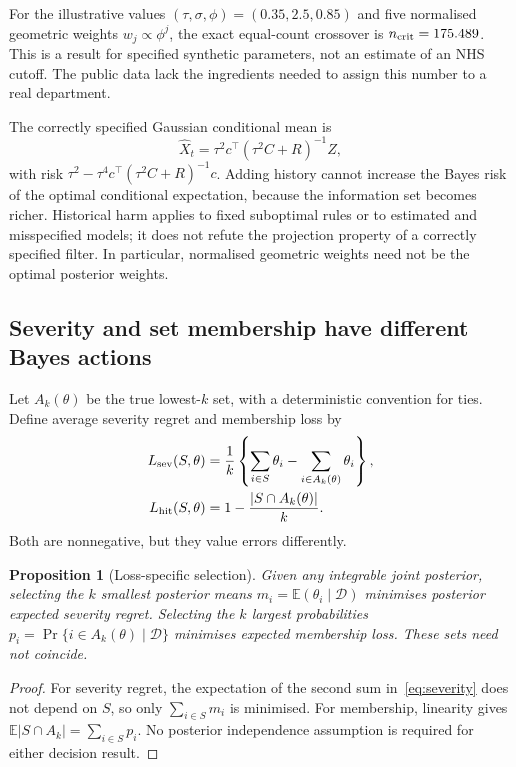 \documentclass[11pt,letterpaper]{article}
\newtheorem{proposition}{Proposition}
\newcommand{\E}{\mathbb E}
\begin{document}
For the illustrative values $(\tau,\sigma,\phi)=(0.35,2.5,0.85)$ and five normalised geometric weights $w_j\propto\phi^j$, the exact equal-count crossover is $n_{\rm crit}=175.489$. This is a result for specified synthetic parameters, not an estimate of an NHS cutoff. The public data lack the ingredients needed to assign this number to a real department.

The correctly specified Gaussian conditional mean is
\begin{equation}
 \widehat X_t=\tau^2c^\top(\tau^2C+R)^{-1}Z,
 \label{eq:gaussian_posterior}
\end{equation}
with risk $\tau^2-\tau^4c^\top(\tau^2C+R)^{-1}c$. Adding history cannot increase the Bayes risk of the optimal conditional expectation, because the information set becomes richer. Historical harm applies to fixed suboptimal rules or to estimated and misspecified models; it does not refute the projection property of a correctly specified filter. In particular, normalised geometric weights need not be the optimal posterior weights.

\subsection{Severity and set membership have different Bayes actions}
Let $A_k(\theta)$ be the true lowest-$k$ set, with a deterministic convention for ties. Define average severity regret and membership loss by
\begin{align}
 L_{\rm sev}(S,\theta)&=\frac1k\left\{\sum_{i\in S}\theta_i-
                                   \sum_{i\in A_k(\theta)}\theta_i\right\},\label{eq:severity}\\
 L_{\rm hit}(S,\theta)&=1-\frac{|S\cap A_k(\theta)|}{k}.\label{eq:hit}
\end{align}
Both are nonnegative, but they value errors differently.
\begin{proposition}[Loss-specific selection]\label{prop:loss}
Given any integrable joint posterior, selecting the $k$ smallest posterior means $m_i=\E(\theta_i\mid\mathcal D)$ minimises posterior expected severity regret. Selecting the $k$ largest probabilities $p_i=\Pr\{i\in A_k(\theta)\mid\mathcal D\}$ minimises expected membership loss. These sets need not coincide.
\end{proposition}
\begin{proof}
For severity regret, the expectation of the second sum in~\eqref{eq:severity} does not depend on $S$, so only $\sum_{i\in S}m_i$ is minimised. For membership, linearity gives $\E|S\cap A_k|=\sum_{i\in S}p_i$. No posterior independence assumption is required for either decision result.
\end{proof}
\end{document}
